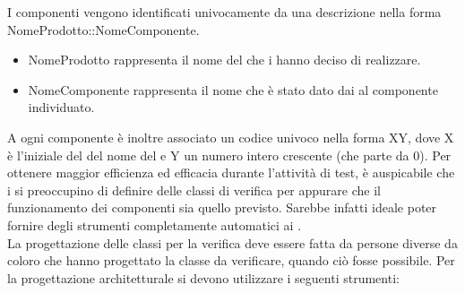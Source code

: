 					 \label{sec:ClassificareComponenti}
					I componenti vengono identificati univocamente da una descrizione nella forma NomeProdotto::NomeComponente.
					\begin{itemize}
						\item NomeProdotto rappresenta il nome del   che i  hanno deciso di realizzare.
						\item NomeComponente rappresenta il nome che è stato dato dai  al componente individuato.
					\end{itemize}
					A ogni componente è inoltre associato un codice univoco nella forma XY, dove X è l'iniziale del del nome del  e Y un numero intero crescente (che parte da 0).
					 \label{sec:TestIntegrazione}
					Per ottenere maggior efficienza ed efficacia durante l'attività di test, è auspicabile che i  si preoccupino di definire delle classi di verifica per appurare che il funzionamento dei componenti sia quello previsto. Sarebbe infatti ideale poter fornire degli strumenti completamente automatici ai .\\
					La progettazione delle classi per la verifica deve essere fatta da persone diverse da coloro che hanno progettato la classe da verificare, quando ciò fosse possibile.
				Per la progettazione architetturale si devono utilizzare i seguenti strumenti:
